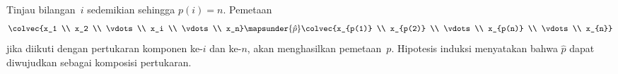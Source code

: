 \begin{exercises}
\begin{answer}
\begin{equation*}
      \end{equation*}
      Tinjau bilangan~$i$ sedemikian sehingga $p(i)=n$.
      Pemetaan
      \begin{equation*}
        \colvec{x_1      \\ x_2      \\ \vdots \\ x_i      \\ \vdots \\ x_n}
        \mapsunder{\hat{p}}
        \colvec{x_{p(1)} \\ x_{p(2)} \\ \vdots \\ x_{p(n)} \\ \vdots  \\ x_{n}}
      \end{equation*}
      jika diikuti dengan pertukaran komponen ke-$i$ dan ke-$n$, akan menghasilkan
      pemetaan~$p$.
      Hipotesis induksi menyatakan bahwa $\hat{p}$ dapat diwujudkan sebagai
      komposisi pertukaran.
    \end{answer}
\end{exercises}
\endinput
